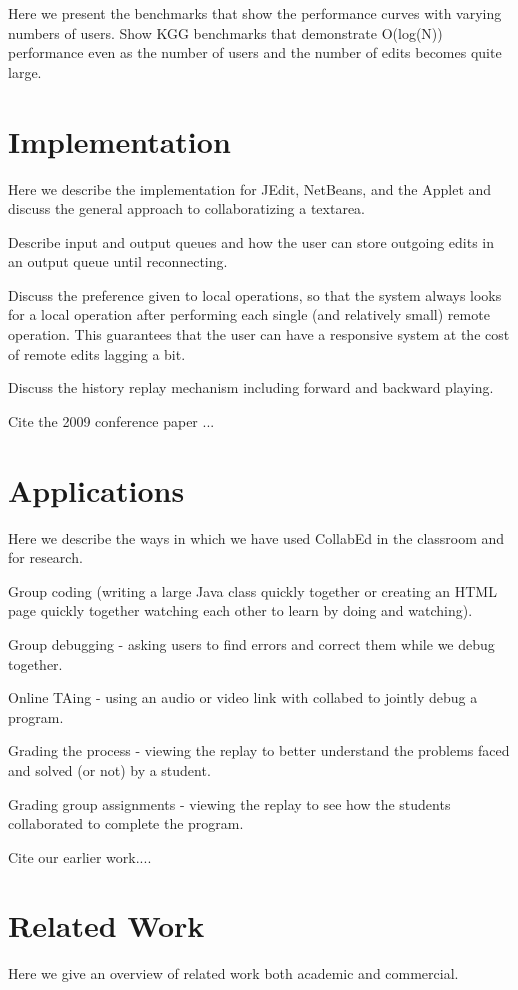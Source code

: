 \documentclass{amsart}
\begin{document}
Here we present the benchmarks that show the performance curves with varying numbers
of users.  Show KGG benchmarks that demonstrate O(log(N)) performance
even as the number of users and the number of edits becomes quite
large.


\newpage
\section{Implementation}
Here we describe the implementation for JEdit, NetBeans, and the Applet and discuss
the general approach to collaboratizing a textarea.


Describe input and output queues and how the user can store
outgoing edits in an output queue until reconnecting.

Discuss the preference given to local operations, so that
the system always looks for a local operation after performing
each single (and relatively small) remote operation. This
guarantees that the user can have a responsive system at the
cost of remote edits lagging a bit.

Discuss the history replay mechanism including forward and
backward playing.

Cite the 2009 conference paper ...

\newpage
\section{Applications}
Here we describe the ways in which we have used CollabEd in the classroom and for
research.

Group coding (writing a large Java class quickly together or
creating an HTML page quickly together watching each other
to learn by doing and watching).

Group debugging - asking users to find errors and correct them
while we debug together.

Online TAing - using an audio or video link with collabed to
jointly debug a program.

Grading the process - viewing the replay to better understand
the problems faced and solved (or not) by a student.

Grading group assignments - viewing the replay to see how the
students collaborated to complete the program.

Cite our earlier work....

\newpage
\section{Related Work}
Here we give an overview of related work both academic and commercial.
\end{document}
